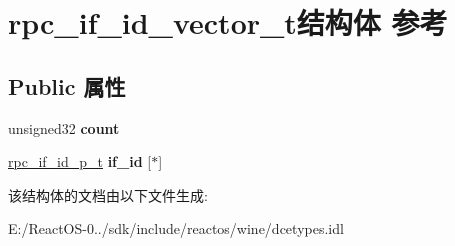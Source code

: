 \hypertarget{structrpc__if__id__vector__t}{}\section{rpc\+\_\+if\+\_\+id\+\_\+vector\+\_\+t结构体 参考}
\label{structrpc__if__id__vector__t}
\subsection*{Public 属性}
\begin{DoxyCompactItemize}
\item 
\mbox{\label{structrpc__if__id__vector__t_a006d029e1e9ad26dee025e69eab17af8}} 
unsigned32 {\bfseries count}
\item 
\mbox{\label{structrpc__if__id__vector__t_aa84bba8f7188fb4fb7c261821e280c08}} 
\hyperlink{structrpc__if__id__t}{rpc\+\_\+if\+\_\+id\+\_\+p\+\_\+t} {\bfseries if\+\_\+id} \mbox{[}$\ast$\mbox{]}
\end{DoxyCompactItemize}


该结构体的文档由以下文件生成\+:\begin{DoxyCompactItemize}
\item 
E\+:/\+React\+O\+S-\/0../sdk/include/reactos/wine/dcetypes.\+idl\end{DoxyCompactItemize}
